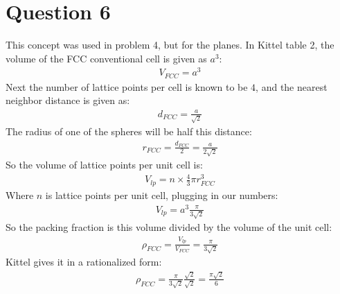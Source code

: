 \documentclass[12pt]{article}
\begin{document}
\section*{Question 6}
This concept was used in problem 4, but for the planes. In Kittel table 2, the volume of the FCC conventional cell is given as $a^3$:
\begin{align*}
  V_{FCC}=a^3
\end{align*}
Next the number of lattice points per cell is known to be $4$, and the nearest neighbor distance is given as:
\begin{align*}
  d_{FCC}=\frac{a}{\sqrt{2}}
\end{align*}
The radius of one of the spheres will be half this distance:
\begin{align*}
  r_{FCC}=\frac{d_{FCC}}{2}=\frac{a}{2\sqrt{2}}
\end{align*}
So the volume of lattice points per unit cell is:
\begin{align*}
  V_{lp}=n\times\frac{4}{3}\pi r_{FCC}^3
\end{align*}
Where $n$ is lattice points per unit cell, plugging in our numbers:
\begin{align*}
  V_{lp}=a^3\frac{\pi}{3\sqrt{2}}
\end{align*}
So the packing fraction is this volume divided by the volume of the unit cell:
\begin{align*}
  \rho_{FCC}=\frac{V_{lp}}{V_{FCC}}=\boxed{\frac{\pi}{3\sqrt{2}}}
\end{align*}
Kittel gives it in a rationalized form:
\begin{align*}
  \rho_{FCC}=\frac{\pi}{3\sqrt{2}}\frac{\sqrt{2}}{\sqrt{2}}
  =\frac{\pi\sqrt{2}}{6}
\end{align*}
\end{document}
